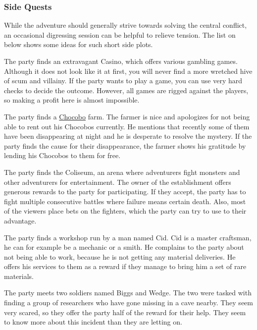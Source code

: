 \subsubsection*{Side Quests}
While the adventure should generally strive towards solving the central conflict, an occasional digressing session can be helpful to relieve tension.
The list on below shows some ideas for such short side plots.
\begin{description}[leftmargin=*]
	
	\item[\color{accent} Casino:]
	The party finds an extravagant Casino, which offers various gambling games.
	Although it does not look like it at first, you will never find a more wretched hive of scum and villainy.
	If the party wants to play a game, you can use very hard checks to decide the outcome.
	However, all games are rigged against the players, so making a profit here is almost impossible.
	
	\item[\color{accent} Chocobo Farm:]
	The party finds a \hyperlink{chocobo}{Chocobo} farm. 
	The farmer is nice and apologizes for not being able to rent out his Chocobos currently. 
	He mentions that recently some of them have been disappearing at night and he is desperate to resolve the mystery.
	If the party finds the cause for their disappearance, the farmer shows his gratitude by lending his Chocobos to them for free.
	
	\item[\color{accent} Coliseum:]
	The party finds the Coliseum, an arena where adventurers fight monsters and other adventurers for entertainment.
	The owner of the establishment offers generous rewards to the party for participating.
	If they accept, the party has to fight multiple consecutive battles where failure means certain death.
	Also, most of the viewers place bets on the fighters, which the party can try to use to their advantage.
	
	\item[\color{accent} Master Craftsman:]
	The party finds a workshop run by a man named Cid.
	Cid is a master craftsman, he can for example be a mechanic or a smith.
	He complains to the party about not being able to work, because he is not getting any material deliveries.
	He offers his services to them as a reward if they manage to bring him a set of rare materials.
	
	\item[\color{accent}Mystery Cave:]
	The party meets two soldiers named Biggs and Wedge.
	The two were tasked with finding a group of researchers who have gone missing in a cave nearby.
	They seem very scared, so they offer the party half of the reward for their help. 
	They seem to know more about this incident than they are letting on.
	

\end{description}

